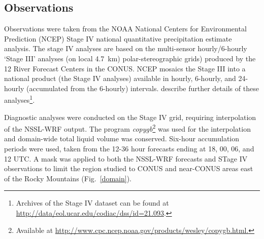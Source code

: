 \subsection{Observations}
\label{observations}

Observations were taken from the NOAA National Centers for Environmental Prediction (NCEP) Stage IV national quantitative precipitation estimate analysis.
The stage IV analyses are based on the multi-sensor hourly/6-hourly `Stage III' analyses (on local \mbox{4.7 km}) polar-stereographic grids) produced by the 12 River Forecast Centers in the CONUS.
NCEP mosaics the Stage III into a national product (the Stage IV analyses) available in hourly, 6-hourly, and 24-hourly (accumulated from the 6-hourly) intervals.
\cite{StageIV} describe further details of these analyses\footnote{Archives of the Stage IV dataset can be found at \url{http://data/eol.ucar.edu/codiac/dss/id=21.093}.}.

Diagnostic analyses were conducted on the Stage IV grid, requiring interpolation of the NSSL-WRF output.
The program \emph{copygb}\footnote{Available at \url{http://www.cpc.ncep.noaa.gov/products/wesley/copygb.html.}} was used for the interpolation and domain-wide total liquid volume was conserved.
Six-hour accumulation periods were used, taken from the 12-36 hour forecasts ending at 18, 00, 06, and 12 UTC.
A mask was applied to both the NSSL-WRF forecasts and STage IV observations to limit the region studied to CONUS and near-CONUS areas east of the Rocky Mountains \mbox{(Fig. \ref{domain})}.



